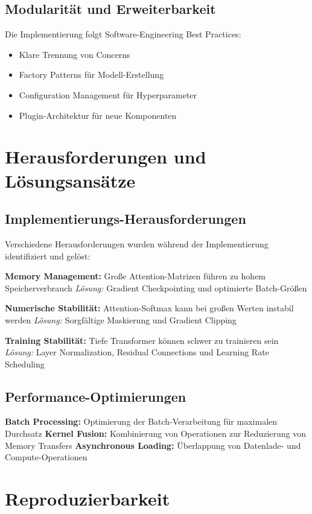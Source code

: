\subsection{Modularität und Erweiterbarkeit}

Die Implementierung folgt Software-Engineering Best Practices:
\begin{itemize}
    \item Klare Trennung von Concerns
    \item Factory Patterns für Modell-Erstellung
    \item Configuration Management für Hyperparameter
    \item Plugin-Architektur für neue Komponenten
\end{itemize}

\section{Herausforderungen und Lösungsansätze}

\subsection{Implementierungs-Herausforderungen}

Verschiedene Herausforderungen wurden während der Implementierung identifiziert und gelöst:

\textbf{Memory Management:} Große Attention-Matrizen führen zu hohem Speicherverbrauch
\textit{Lösung:} Gradient Checkpointing und optimierte Batch-Größen

\textbf{Numerische Stabilität:} Attention-Softmax kann bei großen Werten instabil werden
\textit{Lösung:} Sorgfältige Maskierung und Gradient Clipping

\textbf{Training Stabilität:} Tiefe Transformer können schwer zu trainieren sein
\textit{Lösung:} Layer Normalization, Residual Connections und Learning Rate Scheduling

\subsection{Performance-Optimierungen}

\textbf{Batch Processing:} Optimierung der Batch-Verarbeitung für maximalen Durchsatz
\textbf{Kernel Fusion:} Kombinierung von Operationen zur Reduzierung von Memory Transfers
\textbf{Asynchronous Loading:} Überlappung von Datenlade- und Compute-Operationen

\section{Reproduzierbarkeit}


